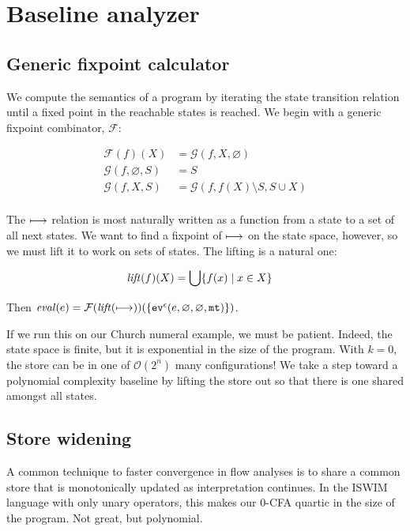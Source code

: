 \documentclass[preprint,onecolumn,9pt]{sigplanconf} %
\begin{document}
\newpage
\section{Baseline analyzer}
\label{sec:baseline}

\subsection{Generic fixpoint calculator}
\label{sec:fixpoint}

We compute the semantics of a program by iterating the state
transition relation until a fixed point in the reachable states is
reached. We begin with a generic fixpoint combinator, ${\mathcal F}$:

\begin{align*}
{\mathcal F}(f)(X) &= {\mathcal G}(f, X, \varnothing) \\
{\mathcal G}(f, \varnothing, S) &= S \\
{\mathcal G}(f, X, S) &= {\mathcal G}(f, f(X) \setminus S, S \cup X) \\
\end{align*}

The $\machstep$ relation is most naturally written as a function from
a state to a set of all next states. We want to find a fixpoint of
$\machstep$ on the state space, however, so we must lift it to work on
sets of states. The lifting is a natural one:

\begin{align*}
\lift(f)(X) &= \bigcup\{f(x) \mid x \in X\}
\end{align*}

Then $\eval(e) = {\mathcal F}(\lift(\machstep))(\{\ev[^\mtcntr]{e, \varnothing, \varnothing, \kmt}\})$.

If we run this on our Church numeral example, we must be
patient. Indeed, the state space is finite, but it is exponential in
the size of the program. With $k = 0$, the store can be in one of ${\mathcal
  O}(2^n)$ many configurations! We take a step toward a polynomial
complexity baseline by lifting the store out so that there is one
shared amongst all states.

\subsection{Store widening}
\label{sec:storewiden}

A common technique to faster convergence in flow analyses is to share
a common store that is monotonically updated as interpretation
continues. In the ISWIM language with only unary operators, this makes
our 0-CFA quartic in the size of the program. Not great, but
polynomial.
\end{document}
